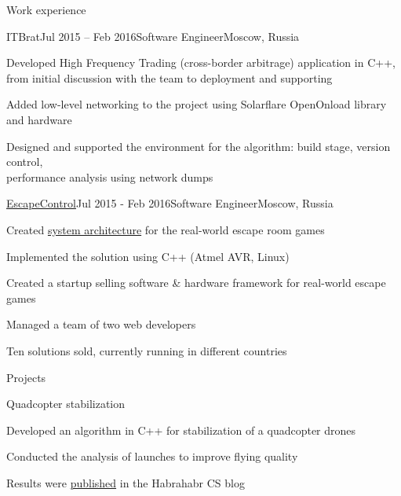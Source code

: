 \documentclass{resume} %
\begin{document}
\begin{rSection}{Work experience}
\begin{rSubsection}{ITBrat}{Jul 2015 -- Feb 2016}{Software Engineer}{Moscow, Russia}
	\item Developed High Frequency Trading (cross-border arbitrage) application in C++, from initial discussion with the team to deployment and supporting
	\item Added low-level networking to the project using Solarflare OpenOnload library and hardware
	\item Designed and supported the environment for the algorithm: build stage, version control,\\ performance analysis using network dumps
\end{rSubsection}
	
\begin{rSubsection}{\href{http://escapecontrol.ru}{EscapeControl}}{Jul 2015 - Feb 2016}{Software Engineer}{Moscow, Russia}
	\item Created \href{http://habr.ru/p/258585/}{system architecture} for the real-world escape room games
	\item Implemented the solution using C++ (Atmel AVR, Linux)
	\item Created a startup selling software \& hardware framework for real-world escape games
	\item Managed a team of two web developers
	\item Ten solutions sold, currently running in different countries
\end{rSubsection}
		
\end{rSection}

\begin{rSection}{Projects}
\begin{rSubsection}{Quadcopter stabilization}{}{}{}
\item Developed an algorithm in C++ for stabilization of a quadcopter drones
\item Conducted the analysis of launches to improve flying quality
\item Results were \href{http://habr.ru/p/216437}{published} in the Habrahabr CS blog
\end{rSubsection}

\end{rSection}

\end{document}

